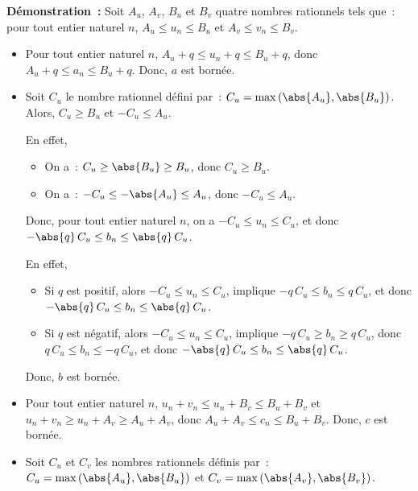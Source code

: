 \noindent\textbf{Démonstration :}
    Soit $A_u$, $A_v$, $B_u$ et $B_v$ quatre nombres rationnels tels que~: pour tout entier naturel $n$, $A_u \leq u_n \leq B_u$ et $A_v \leq v_n \leq B_v$.
    \begin{itemize}[nosep]
        \item Pour tout entier naturel $n$, $A_u + q \leq u_n + q \leq B_u + q$, donc $A_u + q \leq a_n \leq B_u + q$.
            Donc, $a$ est bornée.
        \item Soit $C_u$ le nombre rationnel défini par : $C_u = \mathrm{max}\left(\abs{A_u}, \abs{B_u}\right)$.
            Alors, $C_u \geq B_u$ et $-C_u \leq A_u$.%
            \begin{foot}
                En effet, 
                \begin{itemize}[nosep]
                    \item On a~: $C_u \geq \abs{B_u} \geq B_u$, donc $C_u \geq B_u$.
                    \item On a~: $-C_u \leq -\abs{A_u} \leq A_u$, donc $-C_u \leq A_u$.
                \end{itemize}
                \vspace*{-3ex}
            \end{foot} 
            Donc, pour tout entier naturel $n$, on a $-C_u \leq u_n \leq C_u$, et donc $- \abs{q} \, C_u \leq b_n \leq \abs{q} \, C_u$.%
            \begin{foot}
                En effet, 
                \begin{itemize}[nosep]
                    \item Si $q$ est positif, alors $-C_u \leq u_n \leq C_u$, implique $- q \, C_u \leq b_n \leq q \, C_u$, et donc $- \abs{q} \, C_u \leq b_n \leq \abs{q} \, C_u$. 
                    \item Si $q$ est négatif, alors $-C_u \leq u_n \leq C_u$, implique $- q \, C_u \geq b_n \geq q \, C_u$, donc $q \, C_u \leq b_n \leq -q \, C_u$, et donc $- \abs{q} \, C_u \leq b_n \leq \abs{q} \, C_u$. 
                \end{itemize}
                \vspace*{-3ex}
            \end{foot}
            Donc, $b$ est bornée.
        \item Pour tout entier naturel $n$, $u_n + v_n \leq u_n + B_v \leq B_u + B_v$ et $u_n + v_n \geq u_n + A_v \geq A_u + A_v$, donc $A_u + A_v \leq c_n \leq B_u + B_v$. 
            Donc, $c$ est bornée.
        \item Soit $C_u$ et $C_v$ les nombres rationnels définis par : $C_u = \mathrm{max}\left(\abs{A_u}, \abs{B_u}\right)$ et $C_v = \mathrm{max}\left(\abs{A_v}, \abs{B_v}\right)$.

\end{itemize}
